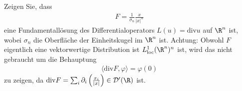 
\begin{exercise}

Zeigen Sie, dass
\begin{align*}
  F = \frac{1}{\sigma_n}\frac{x}{|x|^n}
\end{align*}
eine Fundamentallösung des Differentialoperators $L(u) = \mathrm{div} u$ auf $\R^n$ ist,
wobei $\sigma_n$ die Oberfläche der Einheitskugel im $\R^n$ ist. Achtung:
Obwohl $F$ eigentlich eine vektorwertige Distribution ist $L_{\mathrm{loc}}^1(\R^n)^n$ ist,
wird das nicht gebraucht um die Behauptung
\begin{align*}
  \langle \mathrm{div} F, \varphi \rangle = \varphi(0)
\end{align*}
zu zeigen, da
$\mathrm{div} F = \sum_{i}\partial_i\left(\frac{x_i}{|x|}\right) \in \mathcal{D}^{\prime}(\R)$
ist.
\end{exercise}


\begin{solution}

\phantom{}

\end{solution}

